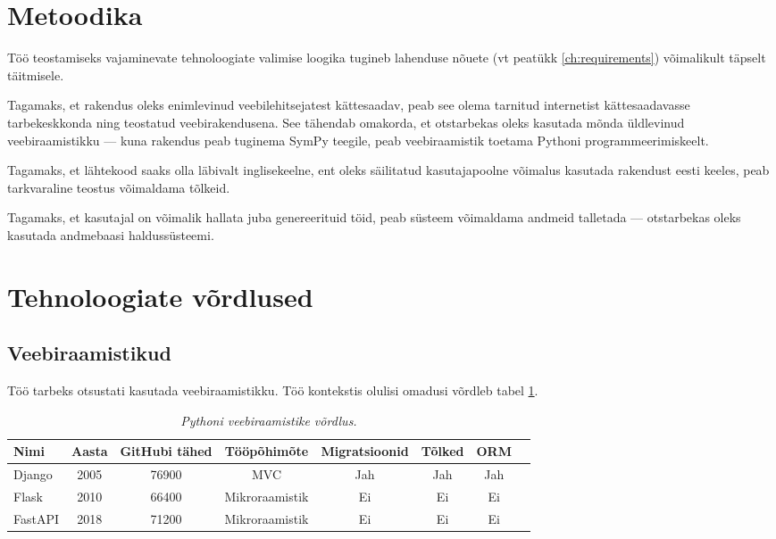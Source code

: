 \section{Metoodika}

Töö teostamiseks vajaminevate tehnoloogiate valimise loogika tugineb lahenduse nõuete (vt peatükk \ref{ch:requirements}) võimalikult täpselt täitmisele.


Tagamaks, et rakendus oleks enimlevinud veebilehitsejatest kättesaadav, peab see olema tarnitud internetist kättesaadavasse tarbekeskkonda ning teostatud veebirakendusena. See tähendab omakorda, et otstarbekas oleks kasutada mõnda üldlevinud veebiraamistikku --- kuna rakendus peab tuginema SymPy teegile, peab veebiraamistik toetama Pythoni programmeerimiskeelt.

Tagamaks, et lähtekood saaks olla läbivalt inglisekeelne, ent oleks säilitatud kasutajapoolne võimalus kasutada rakendust eesti keeles, peab tarkvaraline teostus võimaldama tõlkeid.

Tagamaks, et kasutajal on võimalik hallata juba genereerituid töid, peab süsteem võimaldama andmeid talletada — otstarbekas oleks kasutada andmebaasi haldussüsteemi.

\section{Tehnoloogiate võrdlused}

\subsection{Veebiraamistikud}

Töö tarbeks otsustati kasutada veebiraamistikku. Töö kontekstis olulisi omadusi võrdleb tabel \ref{tab:web-framework-comparison}.

\begin{longtable}{|l|c|c|c|c|c|c|c|}
  \caption{\emph{Pythoni veebiraamistike võrdlus.}}\\ \hline
  \label{tab:web-framework-comparison}
  \textbf{Nimi} & \textbf{Aasta} & \textbf{GitHubi tähed} & \textbf{Tööpõhimõte} & \textbf{Migratsioonid} & \textbf{Tõlked} & \textbf{ORM}\\ \hline
  Django & 2005 \cite{django-faq-why} & 76900 \cite{django-github-repo} & MVC \cite{django-faq-mvc} & Jah & Jah & Jah \\ \hline
  Flask & 2010 \cite{flask-v1} & 66400 \cite{flask-github-repo} & Mikroraamistik \cite{flask-whats-micro} & Ei & Ei & Ei \\ \hline
  FastAPI & 2018 \cite{fastapi-github-commit-log} & 71200 \cite{fastapi-github-repo} & Mikroraamistik \cite{fastapi-microframework} & Ei & Ei & Ei \\ \hline
\end{longtable}

